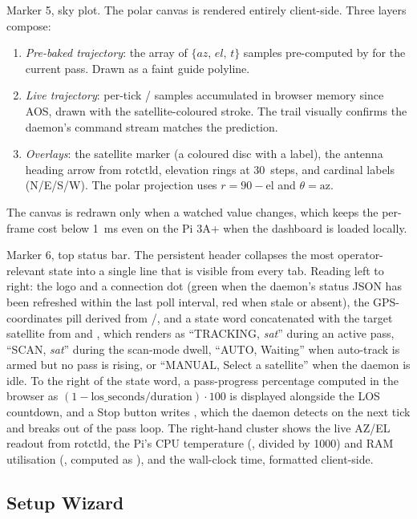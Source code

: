 Marker 5, sky plot. The polar canvas is rendered entirely client-side. Three layers compose:
\begin{enumerate}
    \item \emph{Pre-baked trajectory}: the array of $\{az,\,el,\,t\}$ samples pre-computed by  for the current pass. Drawn as a faint guide polyline.
    \item \emph{Live trajectory}: per-tick / samples accumulated in browser memory since AOS, drawn with the satellite-coloured stroke. The trail visually confirms the daemon's command stream matches the prediction.
    \item \emph{Overlays}: the satellite marker (a coloured disc with a label), the antenna heading arrow from rotctld, elevation rings at 30\degree\ steps, and cardinal labels (N/E/S/W). The polar projection uses $r = 90 - \mathrm{el}$ and $\theta = \mathrm{az}$.
\end{enumerate}
The canvas is redrawn only when a watched value changes, which keeps the per-frame cost below 1~ms even on the Pi 3A+ when the dashboard is loaded locally.

Marker 6, top status bar. The persistent header collapses the most operator-relevant state into a single line that is visible from every tab. Reading left to right: the logo and a connection dot (green when the daemon's status JSON has been refreshed within the last poll interval, red when stale or absent), the GPS-coordinates pill derived from /, and a state word concatenated with the target satellite from  and , which renders as ``TRACKING, \textit{sat}'' during an active pass, ``SCAN, \textit{sat}'' during the scan-mode dwell, ``AUTO, Waiting'' when auto-track is armed but no pass is rising, or ``MANUAL, Select a satellite'' when the daemon is idle. To the right of the state word, a pass-progress percentage computed in the browser as $(1 - \mathrm{los\_seconds}/\mathrm{duration}) \cdot 100$ is displayed alongside the LOS countdown, and a Stop button writes , which the daemon detects on the next tick and breaks out of the pass loop. The right-hand cluster shows the live AZ/EL readout from rotctld, the Pi's CPU temperature (, divided by 1000) and RAM utilisation (, computed as ), and the wall-clock time, formatted client-side.

\subsection{Setup Wizard}

